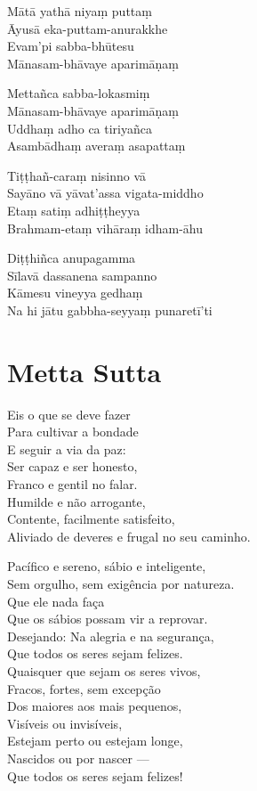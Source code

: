 \documentclass[
  babelLanguage=portuguese,
  final,
  showtrims,
]{chantingbook}
\begin{document}
Mātā yathā niyaṃ puttaṃ\\
Āyusā eka-puttam-anurakkhe\\
Evam'pi sabba-bhūtesu\\
Mānasam-bhāvaye aparimāṇaṃ

Mettañca sabba-lokasmiṃ\\
Mānasam-bhāvaye aparimāṇaṃ\\
Uddhaṃ adho ca tiriyañca\\
Asambādhaṃ averaṃ asapattaṃ

Tiṭṭhañ-caraṃ nisinno vā\\
Sayāno vā yāvat'assa vigata-middho\\
Etaṃ satiṃ adhiṭṭheyya\\
Brahmam-etaṃ vihāraṃ idham-āhu

Diṭṭhiñca anupagamma\\
Sīlavā dassanena sampanno\\
Kāmesu vineyya gedhaṃ\\
Na hi jātu gabbha-seyyaṃ punaretī'ti

\chapter[Metta Sutta]{Metta Sutta}

\begin{leader}
\end{leader}

Eis o que se deve fazer\\
Para cultivar a bondade\\
E seguir a via da paz:\\
Ser capaz e ser honesto,\\
Franco e gentil no falar.\\
Humilde e não arrogante,\\
Contente, facilmente satisfeito,\\
Aliviado de deveres e frugal no seu caminho.

Pacífico e sereno, sábio e inteligente,\\
Sem orgulho, sem exigência por natureza.\\
Que ele nada faça\\
Que os sábios possam vir a reprovar.\\
Desejando: Na alegria e na segurança,\\
Que todos os seres sejam felizes.\\
Quaisquer que sejam os seres vivos,\\
Fracos, fortes, sem excepção\\
Dos maiores aos mais pequenos,\\
Visíveis ou invisíveis,\\
Estejam perto ou estejam longe,\\
Nascidos ou por nascer ---\\
Que todos os seres sejam felizes!
\end{document}
